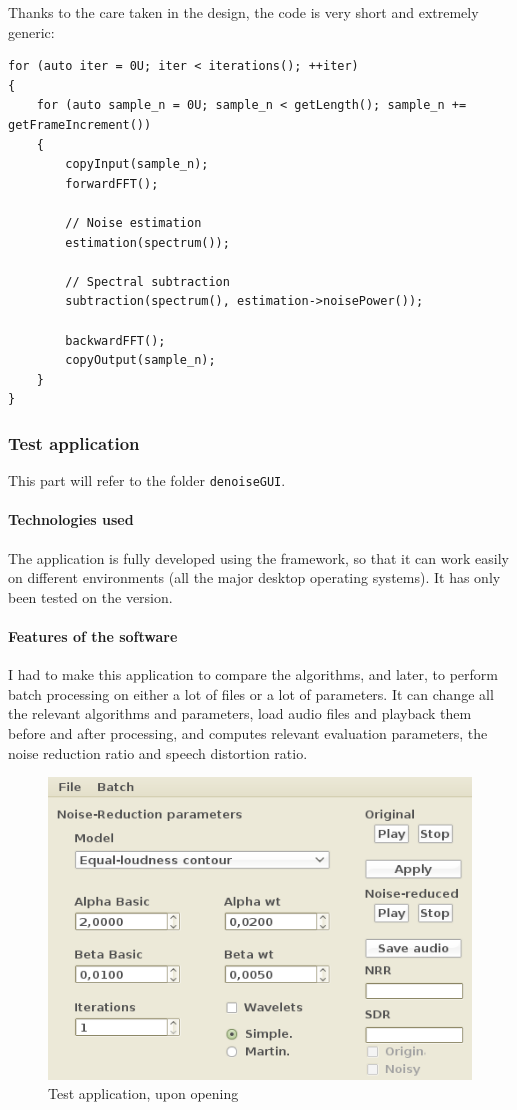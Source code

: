 Thanks to the care taken in the design, the code is very short and extremely generic: 
\begin{lstlisting}[caption=\texttt{SubtractionManager::execute()} in subtraction\_manager.cpp]
for (auto iter = 0U; iter < iterations(); ++iter)
{
	for (auto sample_n = 0U; sample_n < getLength(); sample_n += getFrameIncrement())
	{
		copyInput(sample_n);
		forwardFFT();

		// Noise estimation
		estimation(spectrum());

		// Spectral subtraction
		subtraction(spectrum(), estimation->noisePower());

		backwardFFT();
		copyOutput(sample_n);
	}
}
\end{lstlisting}
\subsubsection{Test application}
This part will refer to the folder \texttt{denoiseGUI}. 
\paragraph{Technologies used}
The application is fully developed using the  framework, so that it can work easily on different environments (all the major desktop operating systems). It has only been tested on the  version.

\paragraph{Features of the software}
I had to make this application to compare the algorithms, and later, to perform batch processing on either a lot of files or a lot of parameters.
It can change all the relevant algorithms and parameters, load audio files and playback them before and after processing, and computes relevant evaluation parameters, the noise reduction ratio and speech distortion ratio\cite{horii2013musical}.
\begin{figure}[h]
\begin{center}
\includegraphics[scale=0.75]{testapp1.png}
\caption{Test application, upon opening}
\label{diag_api_chords}
\end{center}
\end{figure}

